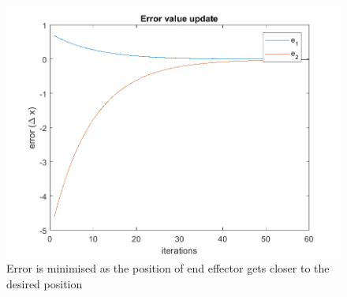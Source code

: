 \begin{figure}[htbp] 
\begin{center}
\includegraphics[width=\textwidth]{images/error_p3_rodrigo}
\caption{Error is minimised as the position of end effector gets closer to the desired position}
\label{fig:part3.joint_trajectory}
\end{center}
\end{figure}